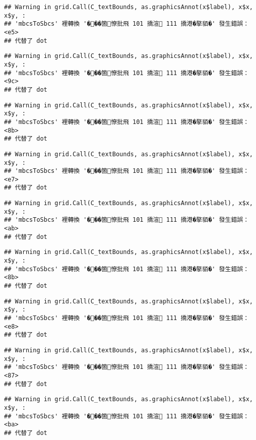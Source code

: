 \documentclass[
]{article}
\begin{document}
\begin{verbatim}
## Warning in grid.Call(C_textBounds, as.graphicsAnnot(x$label), x$x, x$y, :
## 'mbcsToSbcs' 裡轉換 '���箇憭批飛 101 撟渲 111 撟港�摮貊�' 發生錯誤：<e5>
## 代替了 dot
\end{verbatim}

\begin{verbatim}
## Warning in grid.Call(C_textBounds, as.graphicsAnnot(x$label), x$x, x$y, :
## 'mbcsToSbcs' 裡轉換 '���箇憭批飛 101 撟渲 111 撟港�摮貊�' 發生錯誤：<9c>
## 代替了 dot
\end{verbatim}

\begin{verbatim}
## Warning in grid.Call(C_textBounds, as.graphicsAnnot(x$label), x$x, x$y, :
## 'mbcsToSbcs' 裡轉換 '���箇憭批飛 101 撟渲 111 撟港�摮貊�' 發生錯誤：<8b>
## 代替了 dot
\end{verbatim}

\begin{verbatim}
## Warning in grid.Call(C_textBounds, as.graphicsAnnot(x$label), x$x, x$y, :
## 'mbcsToSbcs' 裡轉換 '���箇憭批飛 101 撟渲 111 撟港�摮貊�' 發生錯誤：<e7>
## 代替了 dot
\end{verbatim}

\begin{verbatim}
## Warning in grid.Call(C_textBounds, as.graphicsAnnot(x$label), x$x, x$y, :
## 'mbcsToSbcs' 裡轉換 '���箇憭批飛 101 撟渲 111 撟港�摮貊�' 發生錯誤：<ab>
## 代替了 dot
\end{verbatim}

\begin{verbatim}
## Warning in grid.Call(C_textBounds, as.graphicsAnnot(x$label), x$x, x$y, :
## 'mbcsToSbcs' 裡轉換 '���箇憭批飛 101 撟渲 111 撟港�摮貊�' 發生錯誤：<8b>
## 代替了 dot
\end{verbatim}

\begin{verbatim}
## Warning in grid.Call(C_textBounds, as.graphicsAnnot(x$label), x$x, x$y, :
## 'mbcsToSbcs' 裡轉換 '���箇憭批飛 101 撟渲 111 撟港�摮貊�' 發生錯誤：<e8>
## 代替了 dot
\end{verbatim}

\begin{verbatim}
## Warning in grid.Call(C_textBounds, as.graphicsAnnot(x$label), x$x, x$y, :
## 'mbcsToSbcs' 裡轉換 '���箇憭批飛 101 撟渲 111 撟港�摮貊�' 發生錯誤：<87>
## 代替了 dot
\end{verbatim}

\begin{verbatim}
## Warning in grid.Call(C_textBounds, as.graphicsAnnot(x$label), x$x, x$y, :
## 'mbcsToSbcs' 裡轉換 '���箇憭批飛 101 撟渲 111 撟港�摮貊�' 發生錯誤：<ba>
## 代替了 dot
\end{verbatim}
\end{document}
